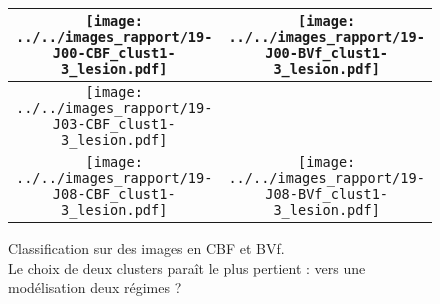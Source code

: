 \begin{figure}[!p]
\begin{center}
\begin{tabular}{|c|c|}
\hline
\texttt{[image: ../../images\_rapport/19-J00-CBF\_clust1-3\_lesion.pdf]}
&
\texttt{[image: ../../images\_rapport/19-J00-BVf\_clust1-3\_lesion.pdf]}
\\
\hline
\texttt{[image: ../../images\_rapport/19-J03-CBF\_clust1-3\_lesion.pdf]}
&
\\
\hline
\texttt{[image: ../../images\_rapport/19-J08-CBF\_clust1-3\_lesion.pdf]}
&
\texttt{[image: ../../images\_rapport/19-J08-BVf\_clust1-3\_lesion.pdf]}
\\
\hline
\end{tabular}
\end{center}
\caption{Classification sur des images en CBF et BVf.%
\\%
Le choix de deux clusters para\^it le plus pertient : vers une mod\'elisation  deux r\'egimes ?}
\label{19_choix_clust_les}
\end{figure}






